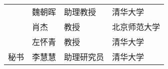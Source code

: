 \begin{committee}[name={学位论文公开评阅人和答辩委员会名单}]
\begin{center}
\begin{tabular}{C{2.75cm}C{2.98cm}C{4.63cm}C{4.63cm}@{}}
          & 魏朝晖                  & 助理教授                  & 清华大学       \\
          & 肖杰                  & 教授                    & 北京师范大学       \\
          & 左怀青                  & 教授                  & 清华大学       \\
      秘书 & 李慧慧                  & 助理研究员              & 清华大学       \\
    \end{tabular}
  \end{center}
\end{committee}



